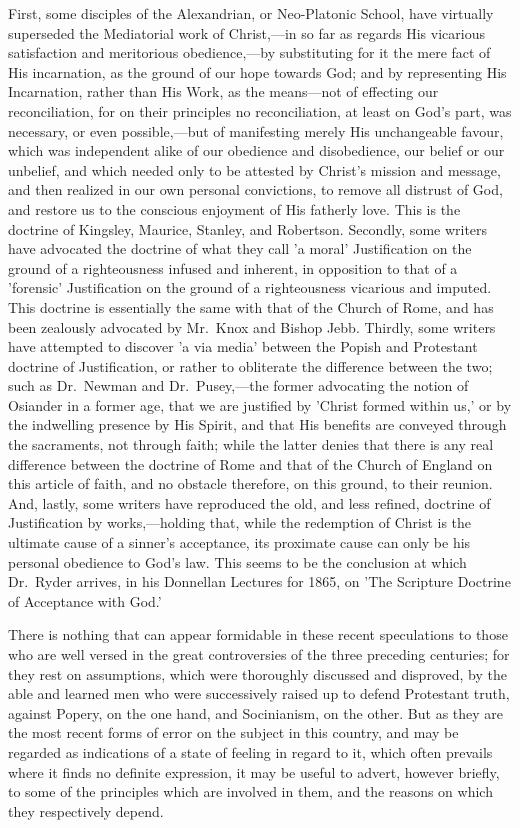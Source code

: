 \documentclass[
]{book}
\begin{document}
First, some disciples of the Alexandrian, or Neo-Platonic School, have virtually superseded the Mediatorial work of Christ,---in so far as regards His vicarious satisfaction and meritorious obedience,---by substituting for it the mere fact of His incarnation, as the ground of our hope towards God; and by representing His Incarnation, rather than His Work, as the means---not of effecting our reconciliation, for on their principles no reconciliation, at least on God's part, was necessary, or even possible,---but of manifesting merely His unchangeable favour, which was independent alike of our obedience and disobedience, our belief or our unbelief, and which needed only to be attested by Christ's mission and message, and then realized in our own personal convictions, to remove all distrust of God, and restore us to the conscious enjoyment of His fatherly love. This is the doctrine of Kingsley, Maurice, Stanley, and Robertson. Secondly, some writers have advocated the doctrine of what they call 'a moral' Justification on the ground of a righteousness infused and inherent, in opposition to that of a 'forensic' Justification on the ground of a righteousness vicarious and imputed. This doctrine is essentially the same with that of the Church of Rome, and has been zealously advocated by Mr.~Knox and Bishop Jebb. Thirdly, some writers have attempted to discover 'a via media' between the Popish and Protestant doctrine of Justification, or rather to obliterate the difference between the two; such as Dr.~Newman and Dr.~Pusey,---the former advocating the notion of Osiander in a former age, that we are justified by 'Christ formed within us,' or by the indwelling presence by His Spirit, and that His benefits are conveyed through the sacraments, not through faith; while the latter denies that there is any real difference between the doctrine of Rome and that of the Church of England on this article of faith, and no obstacle therefore, on this ground, to their reunion. And, lastly, some writers have reproduced the old, and less refined, doctrine of Justification by works,---holding that, while the redemption of Christ is the ultimate cause of a sinner's acceptance, its proximate cause can only be his personal obedience to God's law. This seems to be the conclusion at which Dr.~Ryder arrives, in his Donnellan Lectures for 1865, on 'The Scripture Doctrine of Acceptance with God.'

There is nothing that can appear formidable in these recent speculations to those who are well versed in the great controversies of the three preceding centuries; for they rest on assumptions, which were thoroughly discussed and disproved, by the able and learned men who were successively raised up to defend Protestant truth, against Popery, on the one hand, and Socinianism, on the other. But as they are the most recent forms of error on the subject in this country, and may be regarded as indications of a state of feeling in regard to it, which often prevails where it finds no definite expression, it may be useful to advert, however briefly, to some of the principles which are involved in them, and the reasons on which they respectively depend.
\end{document}
